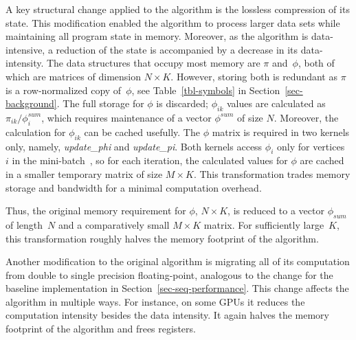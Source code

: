 A key structural change applied to the algorithm is the lossless compression of
its state. This modification enabled the algorithm to process larger data sets
while maintaining all program state in memory. Moreover, as the algorithm is
data-intensive, a reduction of the state is accompanied by a decrease in its
data-intensity.
%
The data structures that occupy most memory are $\pi$ and~$\phi$, both of
which are matrices of dimension ${N}\times{K}$. However, storing both
is redundant as $\pi$ is a row-normalized copy of~$\phi$, see
Table~\ref{tbl-symbols} in Section~\ref{sec-background}. The full storage for
$\phi$ is discarded; $\phi_{ik}$ values are calculated as
$\pi_{ik}/\phi^{sum}_i$, which requires maintenance of a vector
$\phi^{sum}$ of size $N$.
Moreover, the calculation for $\phi_{ik}$ can be cached usefully.
%
The $\phi$ matrix is required in two kernels only, namely, \textit{update\_phi} and
\textit{update\_pi}. Both kernels access $\phi_i$ only for vertices~$i$ in the
mini-batch~\Minibatch, so for each iteration, the calculated values for $\phi$ are cached
in a smaller temporary matrix of size
$M\times{K}$.
%
%
This transformation trades memory storage and
bandwidth for a minimal computation overhead.
%

Thus, the original memory requirement for $\phi$, ${N}\times{K}$, is
reduced to a vector $\phi_{sum}$ of length~$N$ and a comparatively small
$M\times{K}$ matrix. For sufficiently large~$K$, this transformation roughly
halves the memory footprint of the algorithm.

Another modification to the original algorithm is migrating all of its
computation from double to single precision floating-point, analogous to the change
for the baseline implementation in Section~\ref{sec-seq-performance}.
%
This change affects the algorithm in multiple ways. For instance, on some GPUs it
reduces
the computation intensity besides the data intensity. It again halves the memory
footprint of the algorithm and frees registers.

